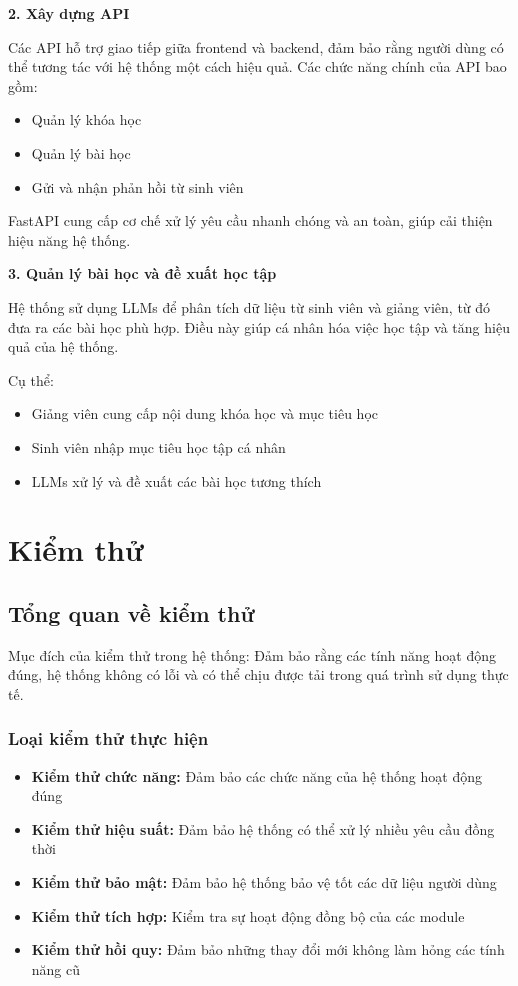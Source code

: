 \textbf{2. Xây dựng API} 

Các API hỗ trợ giao tiếp giữa frontend và backend, đảm bảo rằng người dùng có thể tương tác với hệ thống một cách hiệu quả. Các chức năng chính của API bao gồm:

\begin{itemize}
    \item Quản lý khóa học
    \item Quản lý bài học
    \item Gửi và nhận phản hồi từ sinh viên
\end{itemize}

FastAPI cung cấp cơ chế xử lý yêu cầu nhanh chóng và an toàn, giúp cải thiện hiệu năng hệ thống.

\textbf{3. Quản lý bài học và đề xuất học tập} 

Hệ thống sử dụng LLMs để phân tích dữ liệu từ sinh viên và giảng viên, từ đó đưa ra các bài học phù hợp. Điều này giúp cá nhân hóa việc học tập và tăng hiệu quả của hệ thống.

Cụ thể:

\begin{itemize}
    \item Giảng viên cung cấp nội dung khóa học và mục tiêu học
    \item Sinh viên nhập mục tiêu học tập cá nhân
    \item LLMs xử lý và đề xuất các bài học tương thích
\end{itemize}

\section{Kiểm thử}

\subsection{Tổng quan về kiểm thử}

Mục đích của kiểm thử trong hệ thống: Đảm bảo rằng các tính năng hoạt động đúng, hệ thống không có lỗi và có thể chịu được tải trong quá trình sử dụng thực tế.

\subsubsection{Loại kiểm thử thực hiện}
\begin{itemize}
    \item \textbf{Kiểm thử chức năng:} Đảm bảo các chức năng của hệ thống hoạt động đúng
    \item \textbf{Kiểm thử hiệu suất:} Đảm bảo hệ thống có thể xử lý nhiều yêu cầu đồng thời
    \item \textbf{Kiểm thử bảo mật:} Đảm bảo hệ thống bảo vệ tốt các dữ liệu người dùng
    \item \textbf{Kiểm thử tích hợp:} Kiểm tra sự hoạt động đồng bộ của các module
    \item \textbf{Kiểm thử hồi quy:} Đảm bảo những thay đổi mới không làm hỏng các tính năng cũ
\end{itemize}


